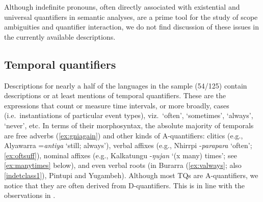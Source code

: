 \documentclass[12pt,egregdoesnotlikesansseriftitles]{scrartcl}
\makeatletter
\newcommand{\ofy}{/125} %
\makeatother
\begin{document}
Although indefinite pronouns, often directly associated with existential and universal quantifiers in semantic analyses, are a prime tool for the study of scope ambiguities and quantifier interaction, we do not find discussion of these issues in the currently available descriptions. %

\subsection{Temporal quantifiers}
\label{sec:tempq}
Descriptions for nearly a half of the languages in the sample (54\ofy) contain descriptions or at least mentions of temporal quantifiers. These are the expressions that count or measure time intervals, or more broadly, cases (i.e.\ instantiations of particular event types), viz.\ `often', `sometimes', `always', `never', etc. In terms of their morphosyntax, the absolute majority of temporals are free adverbs (\ref{ex:gniagain}) and other kinds of A-quantifiers: clitics (e.g., Alyawarra =\textit{antiya} `still; always'), verbal affixes (e.g., Nhirrpi -\textit{parapara} `often'; \ref{ex:oftsuff}), %
nominal affixes (e.g., Kalkatungu -\textit{ŋujan} `(x many) times'; see \ref{ex:manytimes} below), and even verbal roots (in Burarra (\ref{ex:valways}; also \ref{indetclass1}), Pintupi and Yugambeh). Although most TQs are A-quantifiers, we notice that they are often derived from D-quantifiers. This is in line with the observations in \citealt{gil93,keenanpaperno17ov}. %
\end{document}
